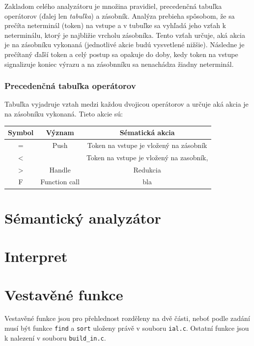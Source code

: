 \documentclass[a4paper,11pt]{article}
\begin{document}
Zakladom celého analyzátoru je množina pravidiel, precedenčná tabuľka operátorov (ďalej len \textit{tabuľka}) a zásobník. Analýza prebieha spôsobom, že sa prečíta neterminál (token) na vstupe a v tubuľke sa vyhľadá jeho vzťah k neterminálu, ktorý je najbližie vrcholu zásobníka. Tento vzťah určuje, aká akcia je na zásobníku vykonaná (jednotlivé akcie budú vysvetlené nižšie). Následne je prečítaný ďaľší token a celý postup sa opakuje do doby, kedy token na vstupe signalizuje koniec výrazu a na zásobnníku sa nenachádza žiadny neterminál.

\subsubsection{Precedenčná tabuľka operátorov}

Tabuľka vyjadruje vztah medzi každou dvojicou operátorov a určuje aká akcia je na zásobníku vykonaná. Tieto akcie sú:

\begin{table}[]
\centering
\label{my-label}
\begin{tabular}{@{}ccc@{}}
\toprule
Symbol       & Význam                            & Sématická akcia                         \\ \midrule
=            & Push                              & Token na vstupe je vložený na zásobník  \\
\textless    &                                   & Token na vstupe je vložený na zasobník, \\
\textgreater & Handle                            & Redukcia                                \\
F            & Function call                     & bla                                     \\ \bottomrule
\end{tabular}
\end{table}

\section{Sémantický analyzátor}


\section{Interpret}

\section{Vestavěné funkce}
Vestavěné funkce jsou pro přehlednost rozděleny na dvě části, neboť podle zadání musí být funkce \texttt{find} a \texttt{sort} uloženy právě v souboru \texttt{ial.c}. Ostatní funkce jsou k nalezení v souboru \texttt{build\_in.c}.
\end{document}

